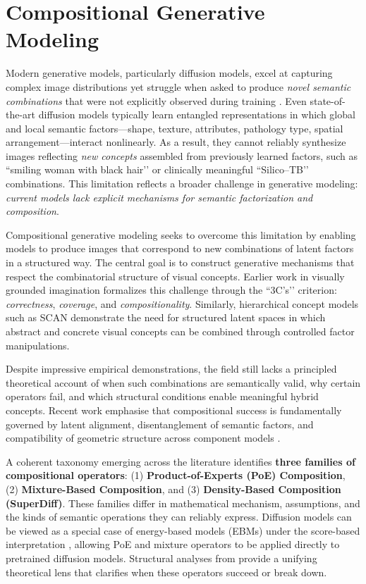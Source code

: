 \section{Compositional Generative Modeling}
\label{sec:compositional_generative_modeling}

Modern generative models, particularly diffusion models, excel at capturing complex image 
distributions yet struggle when asked to produce \emph{novel semantic combinations} that were not explicitly 
observed during training \citep{liu2022compositional}.  
Even state-of-the-art diffusion models typically learn entangled representations in which global 
and local semantic factors---shape, texture, attributes, pathology type, spatial arrangement---interact nonlinearly.  
As a result, they cannot reliably synthesize images reflecting \emph{new concepts} assembled from previously 
learned factors, such as ``smiling woman with black hair’’ \citep{isometric_diffusion_icml_2024}
or clinically meaningful ``Silico--TB’’ combinations.  
This limitation reflects a broader challenge in generative modeling:  
\emph{current models lack explicit mechanisms for semantic factorization and composition}.

Compositional generative modeling seeks to overcome this limitation by enabling 
models to produce images that correspond to new combinations of latent factors in a structured way.  
The central goal is to construct generative mechanisms that respect 
the combinatorial structure of visual concepts.  
Earlier work in visually grounded imagination  
\citep{vedantam2017generative} formalizes this challenge through the “3C’s’’ criterion:  
\emph{correctness}, \emph{coverage}, and \emph{compositionality}.  
Similarly, hierarchical concept models such as SCAN  
\citep{Higgins2017SCANLH} demonstrate the need for structured latent spaces in which abstract 
and concrete visual concepts can be combined through controlled factor manipulations.

Despite impressive empirical demonstrations, the field still lacks a principled
theoretical account of when such combinations are semantically valid, why
certain operators fail, and which structural conditions enable meaningful hybrid
concepts.  Recent work \citep{mechanisms2025projective, du2024compositional} emphasise that compositional success is fundamentally governed by
latent alignment, disentanglement of semantic factors, and compatibility of
geometric structure across component models .

A coherent taxonomy emerging across the literature identifies \textbf{three
families of compositional operators}:  
(1) \textbf{Product-of-Experts (PoE) Composition},  
(2) \textbf{Mixture-Based Composition}, and     
(3) \textbf{Density-Based Composition (SuperDiff)}.  
These families differ in mathematical mechanism, assumptions, and the kinds of
semantic operations they can reliably express.  Diffusion models can be viewed
as a special case of energy-based models (EBMs) under the score-based
interpretation \citep{NEURIPS2020_49856ed4}, allowing PoE and mixture operators
to be applied directly to pretrained diffusion models.  Structural analyses
from \citet{mechanisms2025projective} provide a unifying theoretical
lens that clarifies when these operators succeed or break down.
\vspace{1em}
